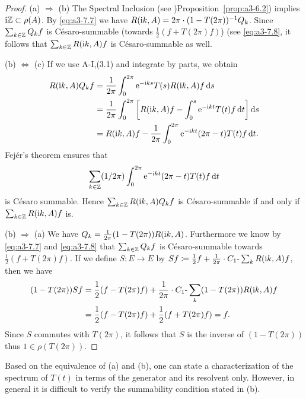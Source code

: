 \begin{proof}
(a) $\Rightarrow$ (b) The Spectral Inclusion (see )Proposition~\ref{prop:a3-6.2}) implies $\mathrm{i}\mathbb{Z} \subset \rho(A)$.
By \eqref{eq:a3-7.7} we have $R(\mathrm{i} k,A) = 2\pi\cdot(1-T(2\pi))^{-1}Q_{k}$.
Since $\sum_{k\in\mathbb{Z}} Q_{k}f$ is Césaro-summable (towards $\frac{1}{2}(f + T(2\pi)f)$) (see \eqref{eq:a3-7.8}, it follows that $\sum_{k\in\mathbb{Z}} R(\mathrm{i} k,A)f$ is Césaro-summable as well.

(b) $\Leftrightarrow$ (c) If we use A-I,(3.1) and integrate by parts, we obtain
\begin{align*}
R(\mathrm{i} k,A)Q_{k}f &= \frac{1}{2\pi}\int_{0}^{2\pi} \mathrm{e}^{-\mathrm{i} ks} T(s)R(\mathrm{i} k,A)f \mathop{}\!\mathrm{d}{s} \\
&= \frac{1}{2\pi}\int_{0}^{2\pi} \left[R(\mathrm{i} k,A)f - \int_{0}^{s} \mathrm{e}^{-\mathrm{i} kt} T(t)f \mathop{}\!\mathrm{d}{t}\right] \mathop{}\!\mathrm{d}{s} \\
&= R(\mathrm{i} k,A)f - \frac{1}{2\pi}\int_{0}^{2\pi} \mathrm{e}^{-\mathrm{i} kt} (2\pi-t) T(t)f \mathop{}\!\mathrm{d}{t} .
\end{align*}
Fejér's theorem ensures that 
%
\[
	 \sum_{k\in\mathbb{Z}} (1/2\pi)\int_{0}^{2\pi} \mathrm{e}^{-\mathrm{i} kt} (2\pi-t) T(t)f \mathop{}\!\mathrm{d}{t} 
\]
%
is Césaro summable.
Hence $\sum_{k\in\mathbb{Z}} R(\mathrm{i} k,A)Q_{k}f$ is Césaro-summable if and only if $\sum_{k\in\mathbb{Z}} R(\mathrm{i} k,A)f$ is.

(b) $\Rightarrow$ (a) We have $Q_{k} = \frac{1}{2\pi}(1 - T(2\pi))R(\mathrm{i} k,A)$.
Furthermore we know by \eqref{eq:a3-7.7} and \eqref{eq:a3-7.8} that $\sum_{k\in\mathbb{Z}} Q_{k}f$ is Césaro-summable towards $\frac{1}{2}(f + T(2\pi)f)$.
If we define $S \colon E \to E$ by $Sf \coloneqq \frac{1}{2}f + \frac{1}{2\pi}\cdot C_{1}\text{-}\sum_k R(\mathrm{i} k,A)f$, then we have
\begin{align*}
(1 - T(2\pi))Sf &= \frac{1}{2}(f - T(2\pi)f) + \frac{1}{2\pi}\cdot C_{1}\text{-}\sum_k (1 - T(2\pi))R(\mathrm{i} k,A)f \\
&= \frac{1}{2}(f - T(2\pi)f) + \frac{1}{2}(f + T(2\pi)f) = f .
\end{align*}
Since $S$ commutes with $T(2\pi)$, it follows that $S$ is the inverse of $(1 - T(2\pi))$ thus $1 \in \rho(T(2\pi))$.
\end{proof}
Based on the equivalence of (a) and (b), one can state a characterization of the spectrum of $T(t)$ in terms of the generator and its resolvent only.
However, in general it is difficult to verify the summability condition stated in (b).

